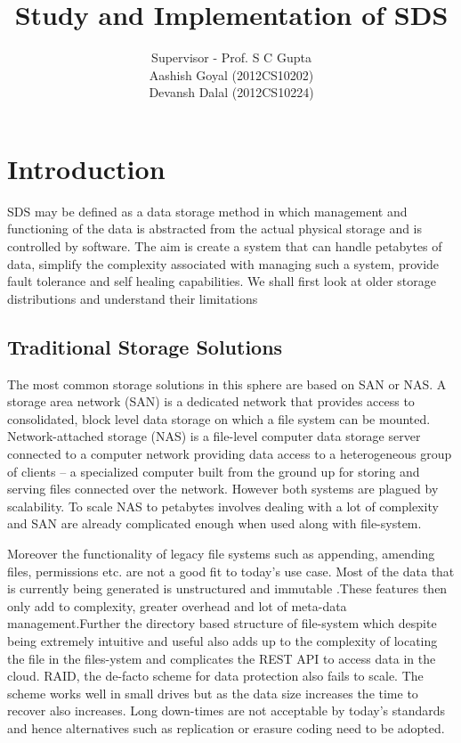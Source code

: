 \documentclass[a4paper,10pt]{article}
\title{ \textbf{Study and Implementation of SDS}}
\author{ Supervisor - Prof. S C Gupta \\
Aashish Goyal (2012CS10202) \\
Devansh Dalal (2012CS10224)  }
\begin{document}
\maketitle


\section{Introduction}
    SDS may be defined as a data storage method in which management and functioning of the data is abstracted from the actual physical storage and is controlled by software. The aim is create a system that can handle petabytes of data,  simplify the complexity associated with managing such a system, provide fault tolerance and self healing capabilities. We shall first look at older storage distributions and understand their limitations
    
\subsection{Traditional Storage Solutions}
    The most common storage solutions in this sphere are based on SAN or NAS. A storage area network (SAN) is a dedicated network that provides access to consolidated, block level data storage on which a file system can be mounted. Network-attached storage (NAS) is a file-level computer data storage server connected to a computer network providing data access to a heterogeneous group of clients --  a specialized computer built from the ground up for storing and serving files connected over the network. However both systems are plagued by scalability. To scale NAS to petabytes involves dealing with a lot of complexity and SAN are already complicated enough when used along with file-system.
    
    Moreover the functionality of legacy file systems such as appending, amending files, permissions etc. are not a good fit to today's use case. Most of the data that is currently being generated is unstructured and immutable .These features then only add to complexity, greater overhead and lot of meta-data management.Further the directory based structure of file-system which despite being extremely intuitive and useful also adds up to the complexity of locating the file in the files-ystem and complicates the REST API to access data in the cloud. RAID, the de-facto scheme for data protection also fails to scale. The scheme works well in small drives but as the data size increases the time to recover also increases. Long down-times are not acceptable by today's standards and hence alternatives such as replication or erasure coding need to be adopted.
    
\end{document}
